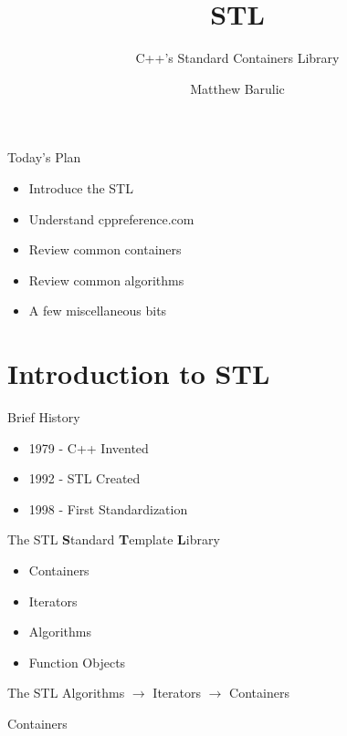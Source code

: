 \documentclass{beamer}
\author{Matthew Barulic}
\title{STL}
\subtitle{C++'s Standard Containers Library}
\institute{
RoboJackets\\
Spring Training Series\\
Georgia Tech
}
\begin{document}
\begin{frame}
	\titlepage
\end{frame}

\begin{frame}{Today's Plan}

\begin{itemize}
	\item Introduce the STL
	\item Understand cppreference.com
	\item Review common containers
	\item Review common algorithms
	\item A few miscellaneous bits
\end{itemize}
	
\end{frame}

\section[Introduction to STL]{Introduction to STL}

\begin{frame}{Brief History}
	\begin{itemize}
		\item 1979 - C++ Invented
		\item 1992 - STL Created
		\item 1998 - First Standardization
	\end{itemize}
\end{frame}

\begin{frame}{The STL}
	\textbf{S}tandard \textbf{T}emplate \textbf{L}ibrary
	\begin{itemize}
		\item Containers
		\item Iterators
		\item Algorithms
		\item Function Objects
	\end{itemize}
\end{frame}

\begin{frame}{The STL}
	Algorithms $\rightarrow$ Iterators $\rightarrow$ Containers
\end{frame}

\begin{frame}{Containers}
	
\end{frame}
\end{document}
